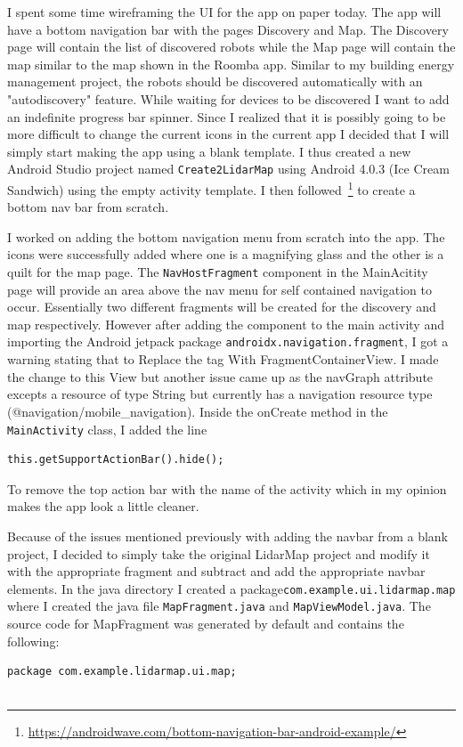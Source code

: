 \documentclass[fontsize=11pt, %
                             paper=a4, %
                             twoside, %
                             captions=tableheading,
                             index=totoc,
                             hyperref]{labbook}
\begin{document}
\begin{addmargin}[0cm]{0cm}
I spent some time wireframing the UI for the app on paper today. The app will have a bottom navigation bar with the pages Discovery and Map. The Discovery page will contain the list of discovered robots while the Map page will contain the map similar to the map shown in the Roomba app. Similar to my building energy management project, the robots should be discovered automatically with an "autodiscovery" feature. While waiting for devices to be discovered I want to add an indefinite progress bar spinner. Since I realized that it is possibly going to be more difficult to change the current icons in the current app I decided that I will simply start making the app using a blank template.
\smallbreak\noindent
I thus created a new Android Studio project named \texttt{Create2LidarMap} using Android 4.0.3 (Ice Cream Sandwich) using the empty activity template. I then followed~\footnote{\url{https://androidwave.com/bottom-navigation-bar-android-example/}} to create a bottom nav bar from scratch. 

I worked on adding the bottom navigation menu from scratch into the app. The icons were successfully added where one is a magnifying glass and the other is a quilt for the map page. The \texttt{NavHostFragment} component in the MainAcitity page will provide an area above the nav menu for self contained navigation to occur. Essentially two different fragments will be created for the discovery and map respectively. However after adding the component to the main activity and importing the Android jetpack package \texttt{androidx.navigation.fragment}, I got a warning stating that to Replace the tag With FragmentContainerView. I made the change to this View but another issue came up as the navGraph attribute excepts a resource of type String but currently has a navigation resource type (@navigation/mobile\_navigation). Inside the onCreate method in the \texttt{MainActivity} class, I added the line
\begin{Verbatim}
this.getSupportActionBar().hide();
\end{Verbatim}
To remove the top action bar with the name of the activity which in my opinion makes the app look a little cleaner.

Because of the issues mentioned previously with adding the navbar from a blank project, I decided to simply take the original LidarMap project and modify it with the appropriate fragment and subtract and add the appropriate navbar elements. In the java directory I created a package\texttt{com.example.ui.lidarmap.map} where I created the java file \texttt{MapFragment.java} and \texttt{MapViewModel.java}. The source code for MapFragment was generated by default and contains the following:
\begin{Verbatim}
package com.example.lidarmap.ui.map;


\end{Verbatim}
\end{addmargin}
\end{document}
